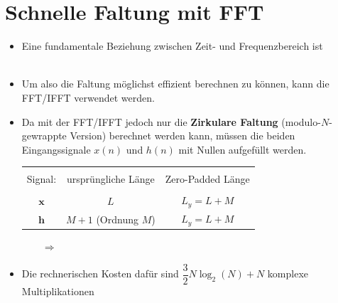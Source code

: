 	
\section{Schnelle Faltung mit FFT}
	\begin{itemize}
	 \item Eine fundamentale Beziehung zwischen Zeit- und Frequenzbereich ist\\[0.2cm]
	 \\[-0.3cm]
	 \item Um also die Faltung möglichst effizient berechnen zu können, kann die FFT/IFFT verwendet werden.\\[0.2cm]
	 \item Da mit der FFT/IFFT jedoch nur die \textbf{Zirkulare Faltung} (modulo-$N$-gewrappte Version) berechnet werden kann, müssen die beiden Eingangssignale $x(n)$ und $h(n)$ mit Nullen aufgefüllt werden.\\[0.2cm]
	 \begin{tabular}{|c|c|c|}
	  \hline&&\\[-0.3cm]
		Signal: & ursprüngliche Länge & Zero-Padded Länge\\[0.1cm]
	  \hline&&\\[-0.3cm]
		$\bm{x}$ & $L$ & $L_y =  L+M$\\
		$\bm{h}$ & $M+1$ (Ordnung $M$) & $L_y = L+M$\\[0.1cm]
	  \hline
	 \end{tabular}$\qquad\Rightarrow\qquad$\\
	 \item Die rechnerischen Kosten dafür sind $\dfrac{3}{2}N\log_2(N) + N$ komplexe Multiplikationen
	\end{itemize}
	
